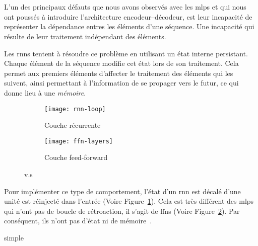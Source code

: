 \section{}
\label{sec.rnn}

L'un des principaux défauts que nous avons observés avec les \glspl{mlp} 
et qui nous ont poussés à introduire l'architecture encodeur--décodeur,
est leur incapacité de représenter la dépendance entres les éléments d'une séquence.
Une incapacité qui résulte de leur traitement indépendant des éléments.

Les \glspl{rnn} tentent à résoudre ce problème en utilisant un état interne persistant.
Chaque élément de la séquence modifie cet état lors de son traitement.
Cela permet aux premiers éléments d'affecter le traitement des éléments qui les suivent, 
ainsi permettant à l'information de se propager vers le futur,
ce qui donne lieu à une \emph{mémoire}.
\begin{figure}[hbt]
    \begin{center}
        \begin{subfigure}{.4\linewidth}
            \texttt{[image: rnn-loop]}
            \caption{Couche récurrente}
            \label{fig.rnn-loop}
        \end{subfigure}
        \begin{subfigure}{.4\linewidth}
            \texttt{[image: ffn-layers]}
            \caption{Couche feed-forward}
            \label{fig.ffn-layer}
        \end{subfigure}
    \end{center}
    \caption{ v.s }
    \label{fig.rnn-vs-ffn}
\end{figure}
Pour implémenter ce type de comportement, 
l'état d'un \gls{rnn} est décalé d'une unité est réinjecté dans l'entrée (Voire Figure~\ref{fig.rnn-loop}).
Cela est très différent des \glspl{mlp} qui n'ont pas de boucle de rétroaction,
il s'agit de \glspl{ffn} (Voire Figure~\ref{fig.ffn-layer}).
Par conséquent, ils n'ont pas d'état ni de mémoire~\cite{Fathi_2021}.


{simple}
